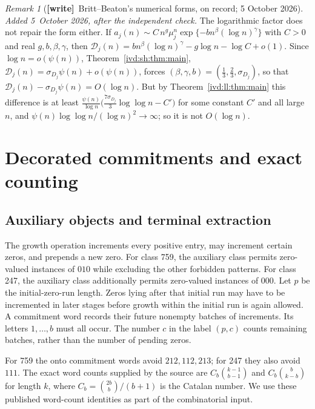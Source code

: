 \documentclass[11pt,letterpaper]{article}
\theoremstyle{remark}\newtheorem{remark}[theorem]{Remark}
\numberwithin{equation}{section}
\newcommand{\Dfc}{\mathcal D}
\newcommand{\wtag}{\textup{\textbf{[write]}}}
\begin{document}
\begin{remark}[\wtag\ Britt--Beaton's numerical forms, on record; 5 October 2026]
\emph{Added 5~October 2026, after the independent check.} The logarithmic factor does not repair the form either. If $a_j(n)\sim C\,n^g\mu_j^n\exp\{-bn^\beta(\log n)^\gamma\}$ with $C>0$ and real $g,b,\beta,\gamma$, then $\Dfc_j(n)=bn^\beta(\log n)^\gamma-g\log n-\log C+o(1)$. Since $\log n=o(\psi(n))$, Theorem~\ref{ivd:sh:thm:main}, $\Dfc_j(n)=\sigma_{D_j}\psi(n)+o(\psi(n))$, forces $(\beta,\gamma,b)=(\frac13,\frac23,\sigma_{D_j})$, so that $\Dfc_j(n)-\sigma_{D_j}\psi(n)=O(\log n)$. But by Theorem~\ref{ivd:ll:thm:main} this difference is at least $\frac{\psi(n)}{\log n}\bigl(\frac{7\sigma_{D_j}}3\log\log n-C'\bigr)$ for some constant $C'$ and all large $n$, and $\psi(n)\log\log n/(\log n)^2\to\infty$; so it is not $O(\log n)$.
\end{remark}

\section{Decorated commitments and exact counting}\label{ivd:sc:sec:counting}
\subsection{Auxiliary objects and terminal extraction}
The growth operation increments every positive entry, may increment
certain zeros, and prepends a new zero. For class 759, the auxiliary
class permits zero-valued instances of $010$ while excluding the other
forbidden patterns. For class 247, the auxiliary class additionally
permits zero-valued instances of $000$. Let $p$ be the initial-zero-run
length. Zeros lying after that initial run may have to be incremented in
later stages before growth within the initial run is again allowed.
A commitment word records their future nonempty batches of increments.
Its letters $1,\ldots,b$ must all occur. The number $c$ in the label
$(p,c)$ counts remaining batches, rather than the number of pending zeros.

For 759 the onto commitment words avoid $212,112,213$; for 247 they
also avoid $111$. The exact word counts supplied by the source are
$C_b\binom{k-1}{b-1}$ and $C_b\binom b{k-b}$ for length $k$, where
$C_b=\binom{2b}b/(b+1)$ is the Catalan number. We use these published
word-count identities as part of the combinatorial input.
\end{document}
